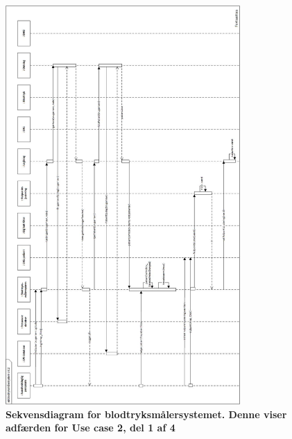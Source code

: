 \begin{figure}[H]
\includegraphics[width =0.8\textwidth , center]{billeder/sdUC2}
\caption{\textbf{Sekvensdiagram for blodtryksmålersystemet. Denne viser adfærden for Use case 2, del 1 af 4}}
\end{figure}

